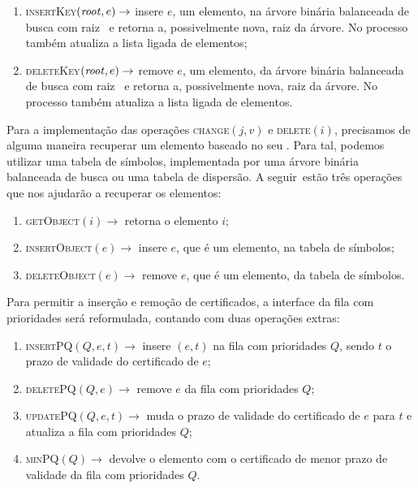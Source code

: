 \begin{enumerate}
    \item \textsc{insertKey}$(\text{\textit{root}},e)\rightarrow$ insere
    $e$, um elemento, na árvore binária balanceada de busca com raiz
    \raiz~e retorna a, possivelmente nova, raiz da árvore.
    No processo também atualiza a lista ligada de elementos;

    \item \textsc{deleteKey}$(\text{\textit{root}},e)\rightarrow$ remove
    $e$, um elemento, da árvore binária balanceada de busca com raiz
    \raiz~e retorna a, possivelmente nova, raiz da árvore.
    No processo também atualiza a lista ligada de elementos.

\end{enumerate}
Para a implementação das operações \textsc{change}$(j, v)$ e
\textsc{delete}$(i)$, precisamos de alguma maneira recuperar um
elemento baseado no seu \id.
Para tal, podemos utilizar uma tabela de símbolos, implementada por uma árvore binária balanceada
de busca ou uma tabela de dispersão.
A seguir~estão três operações que nos ajudarão a recuperar os elementos:

\begin{enumerate}
    \item \textsc{getObject}$(i)\rightarrow$ retorna o elemento $i$;
    \item \textsc{insertObject}$(e) \rightarrow$ insere $e$,
    que é um elemento, na tabela de símbolos;
    \item \textsc{deleteObject}$(e) \rightarrow$ remove $e$,
    que é um elemento, da tabela de símbolos.
\end{enumerate}

Para permitir a inserção e remoção de certificados, a interface da
fila com prioridades será reformulada, contando com duas operações
extras:

\begin{enumerate}
    \item \textsc{insertPQ}$(Q, e, t) \rightarrow$ insere $(e, t)$
    na fila com prioridades $Q$, sendo $t$ o prazo de validade do certificado de $e$;
    \item \textsc{deletePQ}$(Q, e) \rightarrow$ remove $e$
    da fila com prioridades $Q$;
    \item \textsc{updatePQ}$(Q,e,t) \rightarrow$ muda o prazo de
    validade do certificado de $e$ para $t$ e atualiza a fila com
    prioridades $Q$;
    \item \textsc{minPQ}$(Q) \rightarrow$ devolve o elemento com o
    certificado de menor prazo de validade da fila com prioridades
    $Q$.
\end{enumerate}

